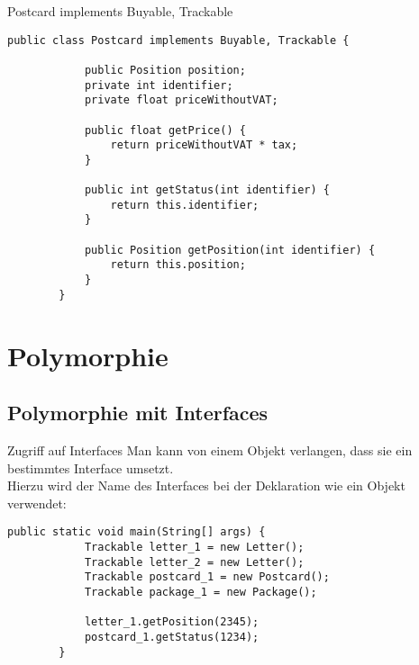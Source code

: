 \begin{frame}[fragile]{Postcard implements Buyable, Trackable}
    \begin{lstlisting}[gobble=8]
        public class Postcard implements Buyable, Trackable {
        
            public Position position;
            private int identifier;
            private float priceWithoutVAT;
            
            public float getPrice() {
                return priceWithoutVAT * tax;
            }
        
            public int getStatus(int identifier) {
                return this.identifier;
            }
            
            public Position getPosition(int identifier) {
                return this.position;
            }
        }
	\end{lstlisting}
\end{frame}


\section{Polymorphie}
\subsection{Polymorphie mit Interfaces}
\begin{frame}[fragile]{Zugriff auf Interfaces}
    Man kann von einem Objekt verlangen, dass sie ein bestimmtes Interface umsetzt. \\
    Hierzu wird der Name des Interfaces bei der Deklaration wie ein Objekt verwendet:
    \begin{lstlisting}[gobble=8]
        public static void main(String[] args) {
            Trackable letter_1 = new Letter();
            Trackable letter_2 = new Letter();
            Trackable postcard_1 = new Postcard();
            Trackable package_1 = new Package();
            
            letter_1.getPosition(2345);
            postcard_1.getStatus(1234);
        }
	\end{lstlisting}
\end{frame}

